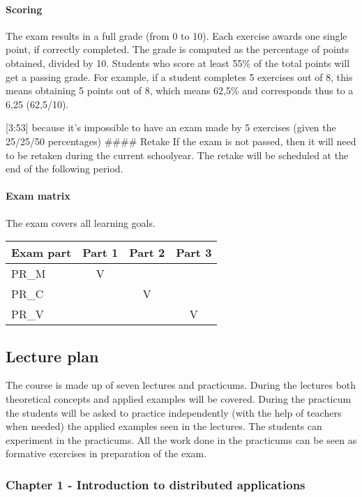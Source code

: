\paragraph{Scoring}\label{scoring}

The exam results in a full grade (from 0 to 10). Each exercise awards
one single point, if correctly completed. The grade is computed as the
percentage of points obtained, divided by 10. Students who score at
least 55\% of the total points will get a passing grade. For example, if
a student completes 5 exercises out of 8, this means obtaining 5 points
out of 8, which means 62,5\% and corresponds thus to a 6,25 (62,5/10).

{[}3:53{]} because it's impossible to have an exam made by 5 exercises
(given the 25/25/50 percentages) \#\#\#\# Retake If the exam is not
passed, then it will need to be retaken during the current schoolyear.
The retake will be scheduled at the end of the following period.
\paragraph{Exam matrix}\label{exam-matrix}

The exam covers all learning goals.

\begin{longtable}[]{@{}lccc@{}}
\toprule
Exam part & Part 1 & Part 2 & Part 3\tabularnewline
\midrule
\endhead
PR\_M & V & &\tabularnewline
PR\_C & & V &\tabularnewline
PR\_V & & & V\tabularnewline
\bottomrule
\end{longtable}

    \subsection{Lecture plan}\label{lecture-plan}

The course is made up of seven lectures and practicums. During the
lectures both theoretical concepts and applied examples will be covered.
During the practicum the students will be asked to practice
independently (with the help of teachers when needed) the applied
examples seen in the lectures. The students can experiment in the
practicums. All the work done in the practicums can be seen as formative
exercises in preparation of the exam.

\subsubsection{Chapter 1 - Introduction to distributed
applications}\label{chapter-1---introduction-to-distributed-applications}

